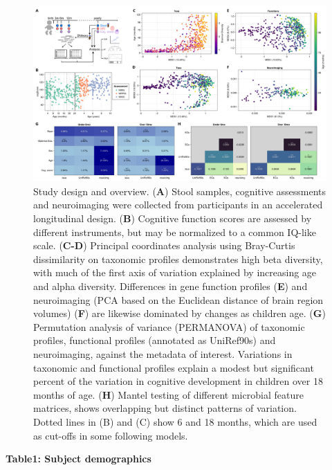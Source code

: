 \documentclass[a4paper]{article}
\begin{document}
\begin{figure}[h]
    \centering
    \includegraphics[width=\textwidth]{assets/Figure1.png}
    \caption{
        Study design and overview. (\textbf{A}) Stool samples, cognitive assessments and
        neuroimaging were collected from participants in an accelerated
        longitudinal design. (\textbf{B}) Cognitive function scores are assessed by
        different instruments, but may be normalized to a common IQ-like scale.
        (\textbf{C-D}) Principal coordinates analysis using Bray-Curtis dissimilarity on
        taxonomic profiles demonstrates high beta diversity, with much of the
        first axis of variation explained by increasing age and alpha diversity.
        Differences in gene function profiles (\textbf{E}) and neuroimaging (PCA based on
        the Euclidean distance of brain region volumes) (\textbf{F}) are likewise
        dominated by changes as children age. (\textbf{G}) Permutation analysis of
        variance (PERMANOVA) of taxonomic profiles, functional profiles
        (annotated as UniRef90s) and neuroimaging, against the metadata of
        interest. Variations in taxonomic and functional profiles explain a
        modest but significant percent of the variation in cognitive development
        in children over 18 months of age. (\textbf{H}) Mantel testing of different
        microbial feature matrices, shows overlapping but distinct patterns of
        variation. Dotted lines in (B) and (C) show 6 and 18 months, which are
        used as cut-offs in some following models.
    }
    \label{fig:Figure 1}
\end{figure}


\textbf{Table1: Subject demographics}
\end{document}

